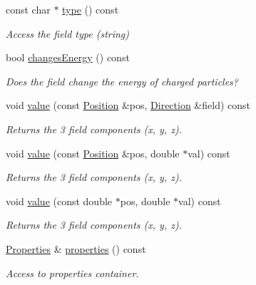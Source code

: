 \begin{DoxyCompactItemize}
const char $\ast$ \hyperlink{class_d_d4hep_1_1_geometry_1_1_cartesian_field_ab54b47102de3afb97b9ea00a741932ea}{type} () const
\begin{DoxyCompactList}\small\item\em Access the field type (string) \end{DoxyCompactList}\item 
bool \hyperlink{class_d_d4hep_1_1_geometry_1_1_cartesian_field_a9655b32e02ee1a4039252aa8623288da}{changes\+Energy} () const
\begin{DoxyCompactList}\small\item\em Does the field change the energy of charged particles? \end{DoxyCompactList}\item 
void \hyperlink{class_d_d4hep_1_1_geometry_1_1_cartesian_field_aee30aac03bc7bcc38be567438e3f5583}{value} (const \hyperlink{namespace_d_d4hep_1_1_geometry_a55083902099d03506c6db01b80404900}{Position} \&pos, \hyperlink{namespace_d_d4hep_1_1_geometry_a56730a0ddb9f3f089c415cd693bd7c19}{Direction} \&field) const
\begin{DoxyCompactList}\small\item\em Returns the 3 field components (x, y, z). \end{DoxyCompactList}\item 
void \hyperlink{class_d_d4hep_1_1_geometry_1_1_cartesian_field_ab110d05cdede2b371b9ca28992108c62}{value} (const \hyperlink{namespace_d_d4hep_1_1_geometry_a55083902099d03506c6db01b80404900}{Position} \&pos, double $\ast$val) const
\begin{DoxyCompactList}\small\item\em Returns the 3 field components (x, y, z). \end{DoxyCompactList}\item 
void \hyperlink{class_d_d4hep_1_1_geometry_1_1_cartesian_field_a9cd91439c980a621f7f178e27bd63221}{value} (const double $\ast$pos, double $\ast$val) const
\begin{DoxyCompactList}\small\item\em Returns the 3 field components (x, y, z). \end{DoxyCompactList}\item 
\hyperlink{class_d_d4hep_1_1_geometry_1_1_cartesian_field_a37a636b9f5ee9ead172cca958dacb920}{Properties} \& \hyperlink{class_d_d4hep_1_1_geometry_1_1_cartesian_field_a94ddb66bcec2bfea86149f574481a25a}{properties} () const
\begin{DoxyCompactList}\small\item\em Access to properties container. \end{DoxyCompactList}\end{DoxyCompactItemize}
